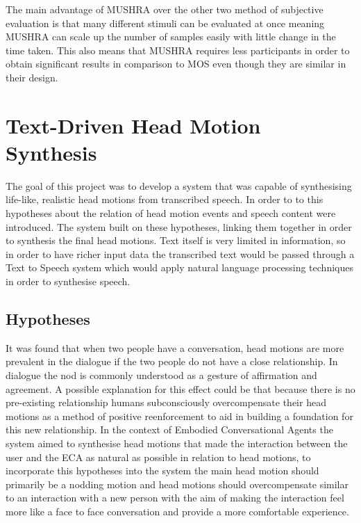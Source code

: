 \documentclass[bsc,frontabs,twoside,singlespacing,parskip]{infthesis}
\begin{document}
The main advantage of MUSHRA over the other two method of subjective evaluation is that many different stimuli can be evaluated at once meaning MUSHRA can scale up the number of samples easily with little change in the time taken. This also means that MUSHRA requires less participants in order to obtain significant results in comparison to MOS even though they are similar in their design.


\chapter{Text-Driven Head Motion Synthesis}

The goal of this project was to develop a system that was capable of synthesising life-like, realistic head motions from transcribed speech. In order to to this hypotheses about the relation of head motion events and speech content were introduced. The system built on these hypotheses, linking them together in order to synthesis the final head motions. Text itself is very limited in information, so in order to have richer input data the transcribed text would be passed through a Text to Speech system which would apply natural language processing techniques in order to synthesise speech. 

\section{Hypotheses}

It was  found that when two people have a conversation, head motions are more prevalent in the dialogue if the two people do not have a close relationship. \cite{first_paper} In dialogue the nod is commonly understood as a gesture of affirmation and agreement. A possible explanation for this effect could be that because there is no pre-existing relationship humans subconsciously overcompensate their head motions as a method of positive reenforcement to aid in building a foundation for this new relationship. In the context of Embodied Conversational Agents the system aimed to synthesise head motions that made the interaction between the user and the ECA as natural as possible in relation to head motions, to incorporate this hypotheses into the system the main head motion should primarily be a nodding motion and head motions should overcompensate similar to an interaction with a new person with the aim of making the interaction feel more like a face to face conversation and provide a  more comfortable experience.
\end{document}

